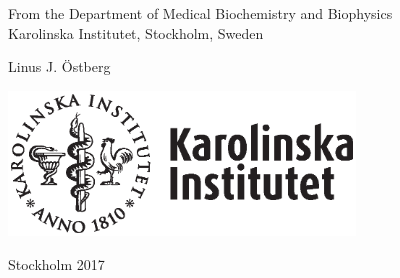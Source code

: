 \begin{titlepage}


  \centering
  {\Large From the Department of Medical Biochemistry and Biophysics\\
  Karolinska Institutet, Stockholm, Sweden\par}
  \vspace{2.5cm}
  {\bfseries\LARGE \MakeUppercase{\thesistitle}\par}
  \vspace{1.5cm}
  {\large Linus J. Östberg\par}
  \vspace{3cm}
  \includegraphics[width=0.69\textwidth]{fig/ki-logo_pos.eps}\par\vspace{1cm}

  \vspace{1.5cm}

  {\large Stockholm 2017\par}
  
  \thispagestyle{empty}

  \restoregeometry
\end{titlepage}